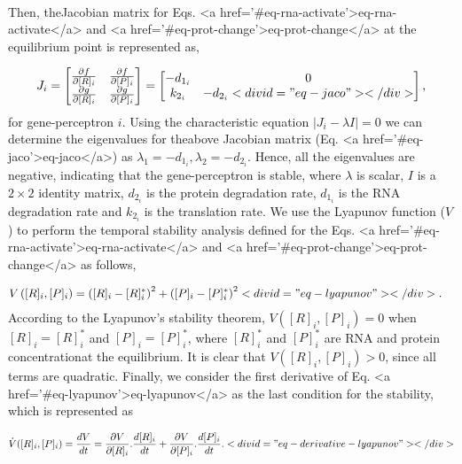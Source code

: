 \documentclass[twocolumn]{biophys-new}
\begin{document}
{{\begin{align}
\end{align}
Then, theJacobian matrix for Eqs. <a href='#eq-rna-activate'>eq-rna-activate</a> and <a href='#eq-prot-change'>eq-prot-change</a> at the equilibrium point is represented as, 

\vspace{-1em}
\begin{align}
J_i = \begin{bmatrix}
\frac{\partial f}{\partial [R]_i} & \frac{\partial f}{\partial [P]_i} \\
\frac{\partial g}{\partial [R]_i} & \frac{\partial g}{\partial [P]_i}
\end{bmatrix}
=\begin{bmatrix}
-d_{1_i} & 0 \\
k_{2_i} & -d_{2_i}<div id="eq-jaco"></div>
 
\end{bmatrix}, 
\end{align}
for gene-perceptron $i$.
Using the characteristic equation $| J_i- \lambda I | = 0$ we can determine the eigenvalues for theabove Jacobian matrix (Eq. <a href='#eq-jaco'>eq-jaco</a>) as $\lambda_1 = -d_{1_i}, \lambda_2=-d_{2_i}$.
Hence, all the eigenvalues are negative, indicating that the gene-perceptron is stable,
where $\lambda$ is scalar, $I$ is a $2 \times 2$ identity matrix, $d_{2_i}$ is the protein degradation rate, $d_{1_i}$ is the RNA degradation rate and $k_{2_i}$ is the translation rate. 
We use the Lyapunov function ($V$) to perform the temporal stability analysis defined for the Eqs. <a href='#eq-rna-activate'>eq-rna-activate</a> and <a href='#eq-prot-change'>eq-prot-change</a> as follows, 

\vspace{-1em}
\begin{align}
V \left( [R]_i, [P]_i \right) &= \left( [R]_i - [R]_i^* \right)^2+ \left( [P]_i - [P]_i^* \right)^2 <div id="eq-lyapunov"></div>
.
\end{align}
According to the Lyapunov's stability theorem, $V \left( [R]_i, [P]_i \right)=0$ when $[R]_i= [R]_i^*$ and $[P]_i= [P]_i^*$, where $[R]_i^*$ and $[P]_i^*$ are RNA and protein concentrationat the equilibrium. It is clear that $V \left( [R]_i, [P]_i \right)>0$, since all terms are quadratic. Finally, we consider the first derivative of Eq. <a href='#eq-lyapunov'>eq-lyapunov</a> as the last condition for the stability, which is represented as 

\vspace{-1em}
\begin{align}
\dot{V}([R]_i,[P]_i)= \dfrac{dV}{dt} = \frac{\partial V}{\partial [R]_i}. \dfrac{d[R]_i}{dt} + \frac{\partial V}{\partial [P]_i}. \dfrac{d[P]_i}{dt}. <div id="eq-derivative-lyapunov"></div>


\end{align}}}
\end{document}
